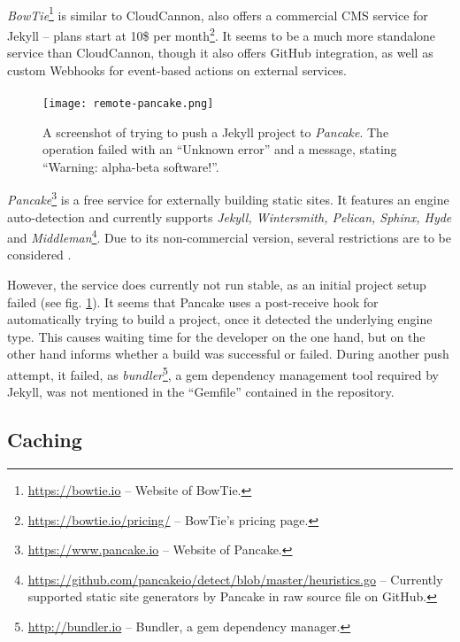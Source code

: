 \paragraph{}
\emph{BowTie}\footnote{\url{https://bowtie.io} -- Website of BowTie.} is similar to CloudCannon, also offers a commercial CMS service for Jekyll -- plans start at 10\$ per month\footnote{\url{https://bowtie.io/pricing/} -- BowTie's pricing page.}. It seems to be a much more standalone service than CloudCannon, though it also offers GitHub integration, as well as custom Webhooks for event-based actions on external services.

\paragraph{}

\begin{figure} %
    \centering
    \texttt{[image: remote-pancake.png]}
    \caption{A screenshot of trying to push a Jekyll project to \emph{Pancake}. The operation failed with an ``Unknown error'' and a message, stating ``Warning: alpha-beta software!''.}
    \label{fig:remote-pancake}
\end{figure}
%
\emph{Pancake}\footnote{\url{https://www.pancake.io} -- Website of Pancake.} is a free service for externally building static sites. It features an engine auto-detection and currently supports \emph{Jekyll, Wintersmith, Pelican, Sphinx, Hyde} and \emph{Middleman}\footnote{\url{https://github.com/pancakeio/detect/blob/master/heuristics.go} -- Currently supported static site generators by Pancake in raw source file on GitHub.}. Due to its non-commercial version, several restrictions are to be considered \cite{PancakeGitProjects}.

However, the service does currently not run stable, as an initial project setup failed (see fig. \ref{fig:remote-pancake}). It seems that Pancake uses a post-receive hook for automatically trying to build a project, once it detected the underlying engine type. This causes waiting time for the developer on the one hand, but on the other hand informs whether a build was successful or failed. During another push attempt, it failed, as \emph{bundler}\footnote{\url{http://bundler.io} -- Bundler, a gem dependency manager.}, a gem dependency management tool required by Jekyll, was not mentioned in the ``Gemfile'' contained in the repository.


\subsection{Caching}
\label{sec:solutions-caching}

